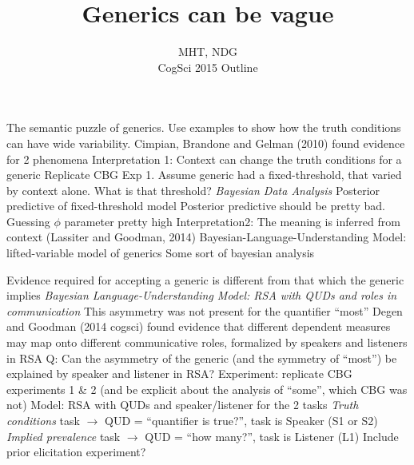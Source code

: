 \documentclass{article}
\begin{document}
\title{Generics can be vague}
\author{MHT, NDG\\CogSci 2015 Outline} \maketitle
 
\begin{outline}
  \0 The semantic puzzle of generics. Use examples to show how the truth conditions can have wide variability. 
  	\0 Cimpian, Brandone and Gelman (2010) found evidence for 2 phenomena 
		\1 Interpretation 1: Context can change the truth conditions for a generic
			\2 Replicate CBG Exp 1. 
			\2 Assume generic had a fixed-threshold, that varied by context alone.
				\3 What is that threshold? \emph{Bayesian Data Analysis}
				\3 Posterior predictive of fixed-threshold model
			\2 Posterior predictive should be pretty bad.
			\2 Guessing $\phi$ parameter pretty high
		\1 Interpretation2: The meaning is inferred from context (Lassiter and Goodman, 2014)
			\2 Bayesian-Language-Understanding Model: lifted-variable model of generics	
			\2 Some sort of bayesian analysis
	
	
 		\2 Evidence required for accepting a generic is different from that which the generic implies
			\3 \emph{Bayesian Language-Understanding Model: RSA with QUDs and roles in communication}
			\3 This asymmetry was not present for the quantifier ``most''
			\3 Degen and Goodman (2014 cogsci) found evidence that different dependent measures may map onto different communicative roles, formalized by speakers and listeners in RSA
			\3 Q: Can the asymmetry of the generic (and the symmetry of ``most'') be explained by speaker and listener in RSA?
			\3 Experiment: replicate CBG experiments 1 \& 2 (and be explicit about the analysis of ``some'', which CBG was not)
			\3 Model: RSA with QUDs and speaker/listener for the 2 tasks
				\4 \emph{Truth conditions} task $\rightarrow$ QUD = ``quantifier is true?'', task is Speaker (S1 or S2)
				\4 \emph{Implied prevalence} task $\rightarrow$ QUD = ``how many?'', task is Listener (L1)
			\3 Include prior elicitation experiment?

			
 \end{outline}
 
\end{document}
